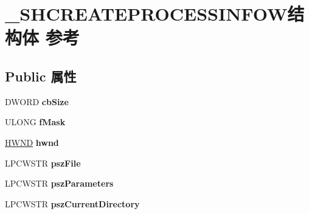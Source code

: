 \hypertarget{struct___s_h_c_r_e_a_t_e_p_r_o_c_e_s_s_i_n_f_o_w}{}\section{\+\_\+\+S\+H\+C\+R\+E\+A\+T\+E\+P\+R\+O\+C\+E\+S\+S\+I\+N\+F\+O\+W结构体 参考}
\label{struct___s_h_c_r_e_a_t_e_p_r_o_c_e_s_s_i_n_f_o_w}
\subsection*{Public 属性}
\begin{DoxyCompactItemize}
\item 
\mbox{\label{struct___s_h_c_r_e_a_t_e_p_r_o_c_e_s_s_i_n_f_o_w_a5c04b8bf97479e77051e2019cd1aecdd}} 
D\+W\+O\+RD {\bfseries cb\+Size}
\item 
\mbox{\label{struct___s_h_c_r_e_a_t_e_p_r_o_c_e_s_s_i_n_f_o_w_a246f32229f2d2642688e8af1d2515fc2}} 
U\+L\+O\+NG {\bfseries f\+Mask}
\item 
\mbox{\label{struct___s_h_c_r_e_a_t_e_p_r_o_c_e_s_s_i_n_f_o_w_aa48060517b668406f651478ac1a835a5}} 
\hyperlink{interfacevoid}{H\+W\+ND} {\bfseries hwnd}
\item 
\mbox{\label{struct___s_h_c_r_e_a_t_e_p_r_o_c_e_s_s_i_n_f_o_w_a012ffabf9c104e3e30e3ffaadb2def65}} 
L\+P\+C\+W\+S\+TR {\bfseries psz\+File}
\item 
\mbox{\label{struct___s_h_c_r_e_a_t_e_p_r_o_c_e_s_s_i_n_f_o_w_aa1c90c950f915dccfbeac3ede58f3045}} 
L\+P\+C\+W\+S\+TR {\bfseries psz\+Parameters}
\item 
\mbox{\label{struct___s_h_c_r_e_a_t_e_p_r_o_c_e_s_s_i_n_f_o_w_a8b5c2a6e6720827db9b7c8d9bced961a}} 
L\+P\+C\+W\+S\+TR {\bfseries psz\+Current\+Directory}
\item 
\mbox{\label{struct___s_h_c_r_e_a_t_e_p_r_o_c_e_s_s_i_n_f_o_w_a2c462b8d0139eaaee06f50ba05f89122}} 

\end{DoxyCompactItemize}
